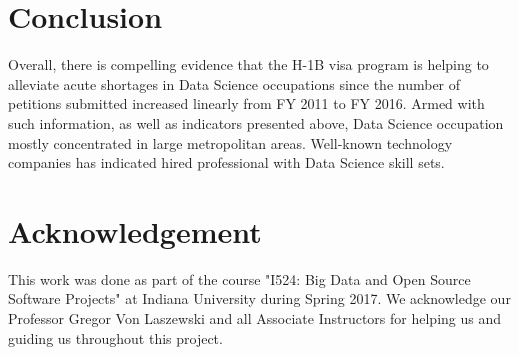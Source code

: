 \documentclass[9pt,twocolumn,twoside]{../../styles/osajnl}
\begin{document}
\section{Conclusion}

Overall, there is compelling evidence that the H-1B visa program is helping to alleviate acute shortages in Data Science occupations since the number of petitions submitted increased linearly from FY 2011 to FY 2016.  Armed with such information, as well as indicators presented above, Data Science occupation mostly concentrated in large metropolitan areas. Well-known technology companies has indicated hired professional with Data Science skill sets. 


\section{Acknowledgement}

This work was done as part of the course "I524: Big Data and Open Source Software Projects" at Indiana University during Spring 2017. We acknowledge our Professor Gregor Von Laszewski and all Associate Instructors for helping us and guiding us throughout this project.




\end{document}

